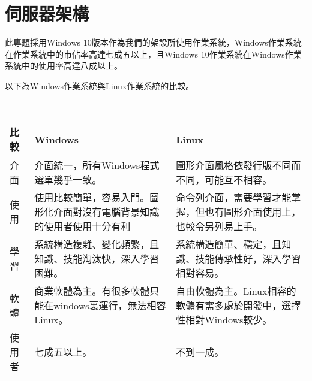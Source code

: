 \chapter{伺服器架構}
\renewcommand{\baselinestretch}{10} %
\par
\renewcommand{\baselinestretch}{1} %
\twelve \qquad 此專題採用Windows 10版本作為我們的架設所使用作業系統，Windows作業系統在作業系統中的市佔率高達七成五以上，且Windows 10作業系統在Windows作業系統中的使用率高達八成以上。
\\
\par
\renewcommand{\baselinestretch}{1} %
\twelve \hspace{0.5em} 以下為Windows作業系統與Linux作業系統的比較。
\par
\\
\begin{center}
\begin{tabular}{|l|p{6.5cm}|p{6.5cm}|} %
\hline
比較&Windows&Linux 
\\
\hline
介面&介面統一，所有Windows程式選單幾乎一致。&圖形介面風格依發行版不同而不同，可能互不相容。
\\
\hline
使用&使用比較簡單，容易入門。圖形化介面對沒有電腦背景知識的使用者使用十分有利&命令列介面，需要學習才能掌握，但也有圖形介面使用上，也較令另列易上手。
\\
\hline
學習&系統構造複雜、變化頻繁，且知識、技能淘汰快，深入學習困難。&系統構造簡單、穩定，且知識、技能傳承性好，深入學習相對容易。
\\
\hline
軟體&商業軟體為主。有很多軟體只能在windows裏運行，無法相容Linux。&自由軟體為主。Linux相容的軟體有需多處於開發中，選擇性相對Windows較少。
\\
\hline
使用者&七成五以上。&不到一成。
\\
\hline
\end{tabular}
\end{center}

\renewcommand{\baselinestretch}{20} %
